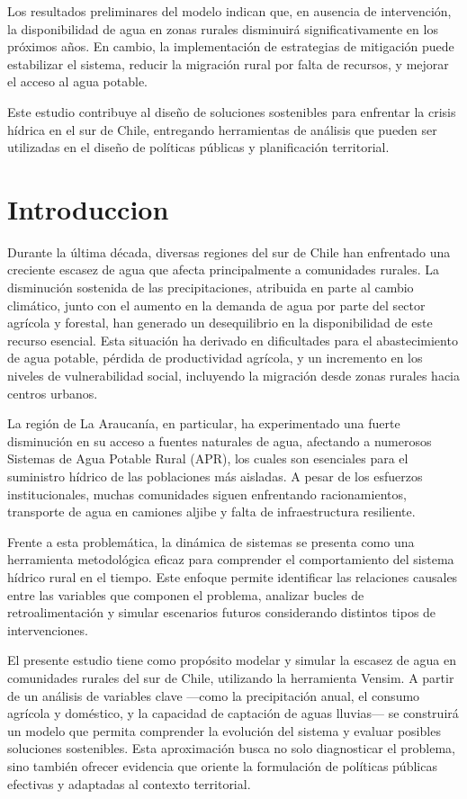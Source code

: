 \documentclass[10pt]{article}
\begin{document}
Los resultados preliminares del modelo indican que, en ausencia de intervención, la disponibilidad de agua en zonas rurales disminuirá significativamente en los próximos años. En cambio, la implementación de estrategias de mitigación puede estabilizar el sistema, reducir la migración rural por falta de recursos, y mejorar el acceso al agua potable.

Este estudio contribuye al diseño de soluciones sostenibles para enfrentar la crisis hídrica en el sur de Chile, entregando herramientas de análisis que pueden ser utilizadas en el diseño de políticas públicas y planificación territorial.
\section{Introduccion}
Durante la última década, diversas regiones del sur de Chile han enfrentado una creciente escasez de agua que afecta principalmente a comunidades rurales. La disminución sostenida de las precipitaciones, atribuida en parte al cambio climático, junto con el aumento en la demanda de agua por parte del sector agrícola y forestal, han generado un desequilibrio en la disponibilidad de este recurso esencial. Esta situación ha derivado en dificultades para el abastecimiento de agua potable, pérdida de productividad agrícola, y un incremento en los niveles de vulnerabilidad social, incluyendo la migración desde zonas rurales hacia centros urbanos.

La región de La Araucanía, en particular, ha experimentado una fuerte disminución en su acceso a fuentes naturales de agua, afectando a numerosos Sistemas de Agua Potable Rural (APR), los cuales son esenciales para el suministro hídrico de las poblaciones más aisladas. A pesar de los esfuerzos institucionales, muchas comunidades siguen enfrentando racionamientos, transporte de agua en camiones aljibe y falta de infraestructura resiliente.

Frente a esta problemática, la dinámica de sistemas se presenta como una herramienta metodológica eficaz para comprender el comportamiento del sistema hídrico rural en el tiempo. Este enfoque permite identificar las relaciones causales entre las variables que componen el problema, analizar bucles de retroalimentación y simular escenarios futuros considerando distintos tipos de intervenciones.

El presente estudio tiene como propósito modelar y simular la escasez de agua en comunidades rurales del sur de Chile, utilizando la herramienta Vensim. A partir de un análisis de variables clave —como la precipitación anual, el consumo agrícola y doméstico, y la capacidad de captación de aguas lluvias— se construirá un modelo que permita comprender la evolución del sistema y evaluar posibles soluciones sostenibles. Esta aproximación busca no solo diagnosticar el problema, sino también ofrecer evidencia que oriente la formulación de políticas públicas efectivas y adaptadas al contexto territorial.
\end{document}
